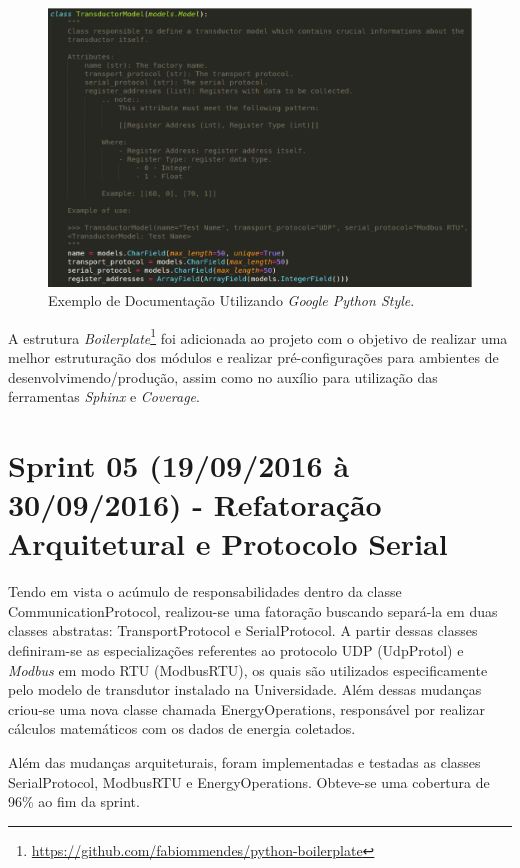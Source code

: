 \begin{figure}[!htpb]
    \centering
    \includegraphics[keepaspectratio=true,scale=0.5]{figuras/documentacao01.eps}
    \caption{Exemplo de Documentação Utilizando \textit{Google Python Style}. }
    \label{documentacao01}
\end{figure}

A estrutura \textit{Boilerplate}\footnote{\url{https://github.com/fabiommendes/python-boilerplate}} foi adicionada ao projeto com o objetivo de realizar uma melhor estruturação dos módulos e realizar pré-configurações para ambientes de desenvolvimendo/produção, assim como no auxílio para utilização das ferramentas \textit{Sphinx} e \textit{Coverage}.

\section{Sprint 05 (19/09/2016 à 30/09/2016) - Refatoração Arquitetural e Protocolo Serial}
Tendo em vista o acúmulo de responsabilidades dentro da classe CommunicationProtocol, realizou-se uma fatoração buscando separá-la em duas classes abstratas: TransportProtocol e SerialProtocol. A partir dessas classes definiram-se as especializações referentes ao protocolo UDP (UdpProtol) e \textit{Modbus} em modo RTU (ModbusRTU), os quais são utilizados especificamente pelo modelo de transdutor instalado na Universidade. Além dessas mudanças criou-se uma nova classe chamada EnergyOperations, responsável por realizar cálculos matemáticos com os dados de energia coletados.

Além das mudanças arquiteturais, foram implementadas e testadas as classes SerialProtocol, ModbusRTU e EnergyOperations. Obteve-se uma cobertura de 96\% ao fim da sprint.

